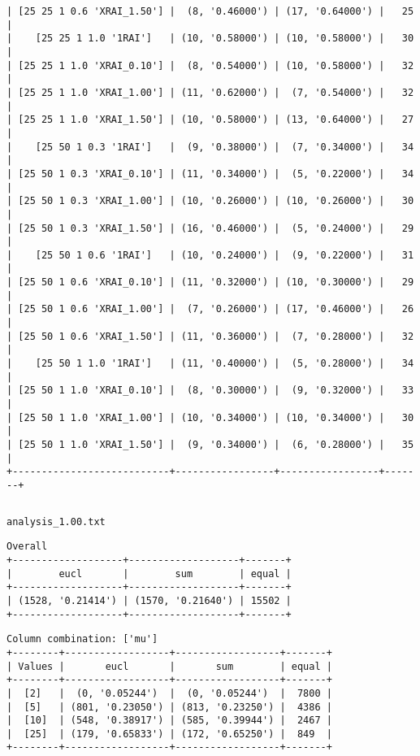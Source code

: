 \documentclass{article}
\begin{document}
\begin{verbatim}
| [25 25 1 0.6 'XRAI_1.50'] |  (8, '0.46000') | (17, '0.64000') |   25  |
|    [25 25 1 1.0 '1RAI']   | (10, '0.58000') | (10, '0.58000') |   30  |
| [25 25 1 1.0 'XRAI_0.10'] |  (8, '0.54000') | (10, '0.58000') |   32  |
| [25 25 1 1.0 'XRAI_1.00'] | (11, '0.62000') |  (7, '0.54000') |   32  |
| [25 25 1 1.0 'XRAI_1.50'] | (10, '0.58000') | (13, '0.64000') |   27  |
|    [25 50 1 0.3 '1RAI']   |  (9, '0.38000') |  (7, '0.34000') |   34  |
| [25 50 1 0.3 'XRAI_0.10'] | (11, '0.34000') |  (5, '0.22000') |   34  |
| [25 50 1 0.3 'XRAI_1.00'] | (10, '0.26000') | (10, '0.26000') |   30  |
| [25 50 1 0.3 'XRAI_1.50'] | (16, '0.46000') |  (5, '0.24000') |   29  |
|    [25 50 1 0.6 '1RAI']   | (10, '0.24000') |  (9, '0.22000') |   31  |
| [25 50 1 0.6 'XRAI_0.10'] | (11, '0.32000') | (10, '0.30000') |   29  |
| [25 50 1 0.6 'XRAI_1.00'] |  (7, '0.26000') | (17, '0.46000') |   26  |
| [25 50 1 0.6 'XRAI_1.50'] | (11, '0.36000') |  (7, '0.28000') |   32  |
|    [25 50 1 1.0 '1RAI']   | (11, '0.40000') |  (5, '0.28000') |   34  |
| [25 50 1 1.0 'XRAI_0.10'] |  (8, '0.30000') |  (9, '0.32000') |   33  |
| [25 50 1 1.0 'XRAI_1.00'] | (10, '0.34000') | (10, '0.34000') |   30  |
| [25 50 1 1.0 'XRAI_1.50'] |  (9, '0.34000') |  (6, '0.28000') |   35  |
+---------------------------+-----------------+-----------------+-------+
\end{verbatim}

\begin{verbatim}

\end{verbatim}

\newpage
\verb|analysis_1.00.txt|
\begin{verbatim}
Overall
+-------------------+-------------------+-------+
|        eucl       |        sum        | equal |
+-------------------+-------------------+-------+
| (1528, '0.21414') | (1570, '0.21640') | 15502 |
+-------------------+-------------------+-------+
\end{verbatim}

\begin{verbatim}
Column combination: ['mu']
+--------+------------------+------------------+-------+
| Values |       eucl       |       sum        | equal |
+--------+------------------+------------------+-------+
|  [2]   |  (0, '0.05244')  |  (0, '0.05244')  |  7800 |
|  [5]   | (801, '0.23050') | (813, '0.23250') |  4386 |
|  [10]  | (548, '0.38917') | (585, '0.39944') |  2467 |
|  [25]  | (179, '0.65833') | (172, '0.65250') |  849  |
+--------+------------------+------------------+-------+
\end{verbatim}
\end{document}
